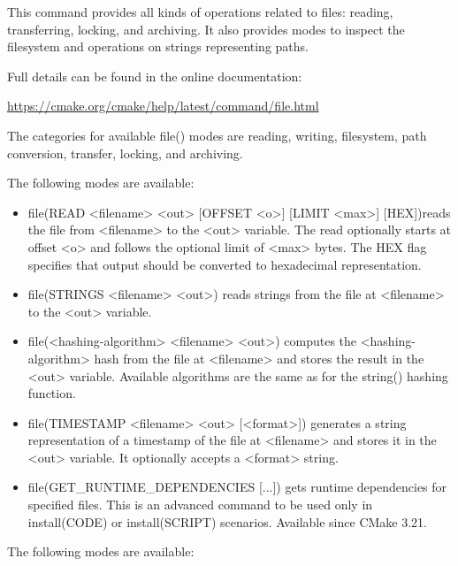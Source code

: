 
This command provides all kinds of operations related to files: reading, transferring, locking, and archiving. It also provides modes to inspect the filesystem and operations on strings representing paths.

Full details can be found in the online documentation:

\url{https://cmake.org/cmake/help/latest/command/file.html}

The categories for available file() modes are reading, writing, filesystem, path conversion, transfer, locking, and archiving.


The following modes are available:

\begin{itemize}
\item
file(READ <filename> <out> [OFFSET <o>] [LIMIT <max>] [HEX])reads the file from <filename> to the <out> variable. The read optionally starts at offset <o> and follows the optional limit of <max> bytes. The HEX flag specifies that output should be converted to hexadecimal representation.

\item
file(STRINGS <filename> <out>) reads strings from the file at <filename> to the <out> variable.

\item
file(<hashing-algorithm> <filename> <out>) computes the <hashing-algorithm> hash from the file at <filename> and stores the result in the <out> variable. Available algorithms are the same as for the string() hashing function.

\item
file(TIMESTAMP <filename> <out> [<format>]) generates a string representation of a timestamp of the file at <filename> and stores it in the <out> variable. It optionally accepts a <format> string.

\item
file(GET\_RUNTIME\_DEPENDENCIES [...]) gets runtime dependencies for specified files. This is an advanced command to be used only in install(CODE) or install(SCRIPT) scenarios. Available since CMake 3.21.
\end{itemize}


The following modes are available:

